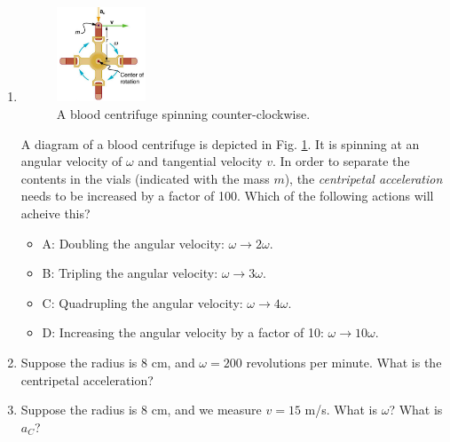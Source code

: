 \documentclass{article}
\begin{document}
\begin{enumerate}
\item 
\begin{figure}[ht]
\centering
\includegraphics[width=0.25\textwidth]{cent.png}
\caption{\label{fig:cent} A blood centrifuge spinning counter-clockwise.}
\end{figure}

A diagram of a blood centrifuge is depicted in Fig. \ref{fig:cent}.  It is spinning at an angular velocity of $\omega$ and tangential velocity $v$.  In order to separate the contents in the vials (indicated with the mass $m$), the \textit{centripetal acceleration} needs to be increased by a factor of 100.  Which of the following actions will acheive this?
\begin{itemize}
\item A: Doubling the angular velocity: $\omega \rightarrow 2\omega$.
\item B: Tripling the angular velocity: $\omega \rightarrow 3\omega$.
\item C: Quadrupling the angular velocity: $\omega \rightarrow 4\omega$.
\item D: Increasing the angular velocity by a factor of 10: $\omega \rightarrow 10\omega$.
\end{itemize}
\item Suppose the radius is 8 cm, and $\omega = 200$ revolutions per minute.  What is the centripetal acceleration? \\ \vspace{2cm}
\item Suppose the radius is 8 cm, and we measure $v = 15$ m/s.  What is $\omega$?  What is $a_C$?
\end{enumerate}
\end{document}
